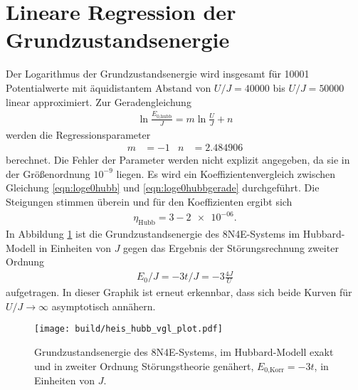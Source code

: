 \section{Lineare Regression der Grundzustandsenergie}
\label{sec:linreg}

Der Logarithmus der Grundzustandsenergie wird insgesamt für 10001 Potentialwerte mit äquidistantem Abstand von $U/J = \num{40000}$ bis $U/J = \num{50000}$ linear approximiert.
Zur Geradengleichung
\begin{align}
  \ln{\frac{E_\text{0,hubb}}{J}} = m \ln{\frac{U}{J}} + n
  \label{eqn:loge0hubbgerade}
\end{align}
werden die Regressionsparameter
\begin{align}
  m & = -1 & n & = 2.484906
  \label{eqn:regressionsparameter}
\end{align}
berechnet. Die Fehler der Parameter werden nicht explizit angegeben, da sie in der Größenordnung $10^{-9}$ liegen.
Es wird ein Koeffizientenvergleich zwischen Gleichung \eqref{eqn:loge0hubb} und \eqref{eqn:loge0hubbgerade} durchgeführt.
Die Steigungen stimmen überein und für den Koeffizienten ergibt sich
\begin{align}
   \eta_\text{Hubb} = 3 - \num{2e-06}.
\end{align}
In Abbildung \ref{fig:e0plot} ist die Grundzustandsenergie des 8N4E-Systems im Hubbard-Modell in Einheiten von $J$ gegen das Ergebnis der Störungsrechnung zweiter Ordnung
\begin{align*}
  E_0/J = - 3 t/J = - 3 \frac{4J}{U}
\end{align*}
aufgetragen. In dieser Graphik ist erneut erkennbar, dass sich beide Kurven für $U/J \to \infty$ asymptotisch annähern.

\begin{figure}[H]
  \centering
  \texttt{[image: build/heis\_hubb\_vgl\_plot.pdf]}
  \caption{Grundzustandsenergie des 8N4E-Systems, im Hubbard-Modell exakt und in zweiter Ordnung Störungstheorie genähert, $E_{0\text{,Korr}} = -3t$, in Einheiten von $J$.}
  \label{fig:e0plot}
\end{figure}
